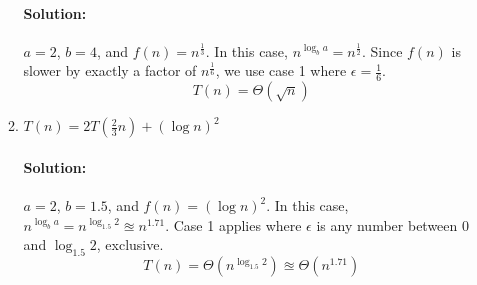 \documentclass{article}
\begin{document}
\begin{enumerate}
\begin{enumerate}
    \paragraph{Solution:}
    \(a=2\), \(b=4\), and \(f(n)=n^{\frac{1}{3}}\).
    In this case, \(n^{\log_b a} = n^{\frac{1}{2}}\).
    Since \(f(n)\) is slower by exactly a factor of \(n^{\frac{1}{6}}\),
    we use case 1 where \(\epsilon=\frac{1}{6}\).
    \[T(n)=\Theta(\sqrt{n})\]
  \item \(T(n) = 2T(\frac{2}{3}n) + (\log n)^2\)
    \paragraph{Solution:}
    \(a=2\), \(b=1.5\), and \(f(n)=(\log n)^2\).
    In this case, \(n^{\log_b a} = n^{\log_{1.5} 2} \approxeq n^{1.71}\).
    Case 1 applies where \(\epsilon\) is any number between 0 and
    \(\log_{1.5} 2\), exclusive.
    \[T(n) = \Theta(n^{\log_{1.5} 2}) \approxeq \Theta(n^{1.71})\]
  \end{enumerate}

\end{enumerate}
\end{document}
